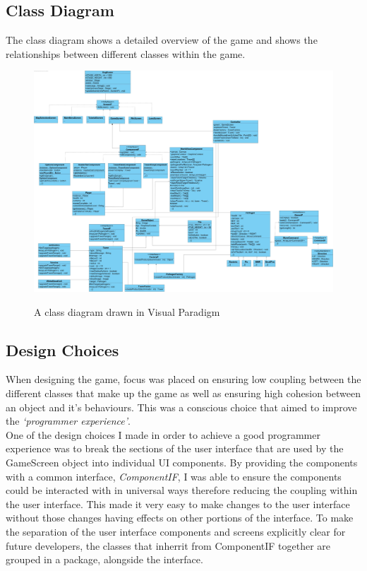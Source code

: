 \documentclass[a4paper,12pt]{article}
\begin{document}
\subsection*{Class Diagram}
The class diagram shows a detailed overview of the game and shows the relationships between different classes within the game.
\newpage
\begin{figure}[!h]
	\begin{center}
		\includegraphics[width=23cm, angle=90, origin=h]{images/Class-Diagram.jpg}
		\\
		\caption{A class diagram drawn in Visual Paradigm}
	\end{center}
\end{figure}

\subsection*{Design Choices}
When designing the game, focus was placed on ensuring low coupling between the different classes that make up the game as well as ensuring high cohesion between an object and it's behaviours. This was a conscious choice that aimed to improve the \textit{`programmer experience'}.
\\
One of the design choices I made in order to achieve a good programmer experience was to break the sections of the user interface that are used by the GameScreen object into individual UI components. By providing the components with a common interface, \textit{ComponentIF}, I was able to ensure the components could be interacted with in universal ways therefore reducing the coupling within the user interface. This made it very easy to make changes to the user interface without those changes having effects on other portions of the interface. To make the separation of the user interface components and screens explicitly clear for future developers, the classes that inherrit from ComponentIF together are grouped in a package, alongside the interface. 
\end{document}
